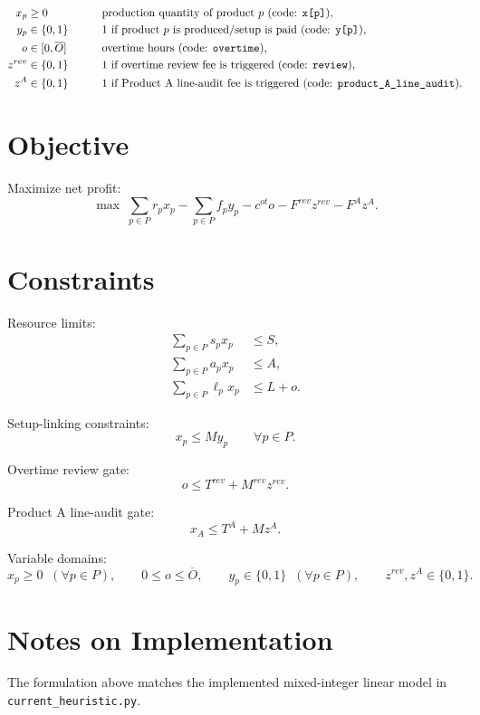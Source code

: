 \begin{align*}
x_p &\ge 0 \qquad &&\text{production quantity of product } p \text{ (code: \texttt{x[p]})},\\
y_p &\in \{0,1\} \qquad &&\text{1 if product } p \text{ is produced/setup is paid (code: \texttt{y[p]})},\\
o &\in [0,\overline{O}] \qquad &&\text{overtime hours (code: \texttt{overtime})},\\
z^{rev} &\in \{0,1\} \qquad &&\text{1 if overtime review fee is triggered (code: \texttt{review})},\\
z^{A} &\in \{0,1\} \qquad &&\text{1 if Product A line-audit fee is triggered (code: \texttt{product\_A\_line\_audit})}.
\end{align*}

\section*{Objective}

Maximize net profit:
\[
\max \;
\sum_{p \in P} r_p x_p
-\sum_{p \in P} f_p y_p
-c^{ot} o
-F^{rev} z^{rev}
-F^{A} z^{A}.
\]

\section*{Constraints}

Resource limits:
\begin{align*}
\sum_{p \in P} s_p x_p &\le S,\\
\sum_{p \in P} a_p x_p &\le A,\\
\sum_{p \in P} \ell_p x_p &\le L + o.
\end{align*}

Setup-linking constraints:
\[
x_p \le M y_p \qquad \forall p \in P.
\]

Overtime review gate:
\[
o \le T^{rev} + M^{rev} z^{rev}.
\]

Product A line-audit gate:
\[
x_A \le T^A + M z^{A}.
\]

Variable domains:
\[
x_p \ge 0 \;\; (\forall p \in P), \qquad
0 \le o \le \overline{O}, \qquad
y_p \in \{0,1\} \;\; (\forall p \in P), \qquad
z^{rev}, z^{A} \in \{0,1\}.
\]

\section*{Notes on Implementation}

The formulation above matches the implemented mixed-integer linear model in \texttt{current\_heuristic.py}.


